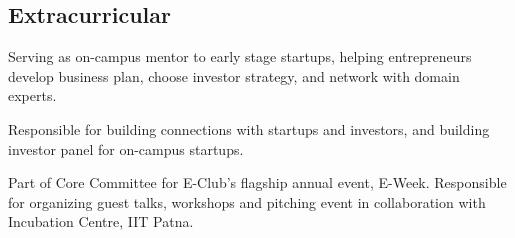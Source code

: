 \documentclass[]{deedy}
\begin{document}
%
\begin{minipage}[t]{0.25\textwidth} 
\begin{flushleft}
%
\end{flushleft}
\end{minipage}
\hfill
%
\begin{minipage}[t]{0.72\textwidth}
\begin{flushleft}
%
\section{Extracurricular}
\begin{tightemize}
\item Serving as on-campus mentor to early stage startups, helping entrepreneurs develop business plan, choose investor strategy, and network with domain experts.
\item Responsible for building connections with startups and investors, and building investor panel for on-campus startups.
\item Part of Core Committee for E-Club’s flagship annual event, E-Week. Responsible for organizing guest talks, workshops and pitching event in collaboration with Incubation Centre, IIT Patna.
\end{tightemize}
\sectionsep
%
\end{flushleft}
\end{minipage}
\end{document}
